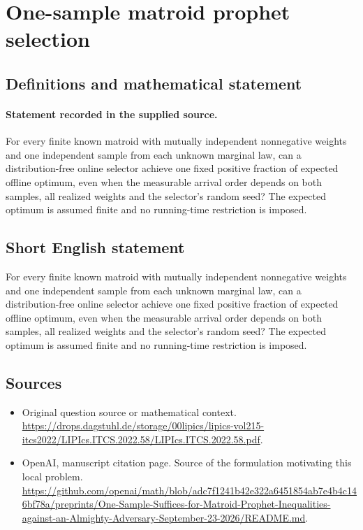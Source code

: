 \documentclass[11pt]{article}
\begin{document}
\section*{One-sample matroid prophet selection}\label{statement}
\subsection{Definitions and mathematical statement}
\paragraph{Statement recorded in the supplied source.}
For every finite known matroid with mutually independent nonnegative weights and one independent sample from each unknown marginal law, can a distribution-free online selector achieve one fixed positive fraction of expected offline optimum, even when the measurable arrival order depends on both samples, all realized weights and the selector’s random seed? The expected optimum is assumed finite and no running-time restriction is imposed.
\subsection{Short English statement}
For every finite known matroid with mutually independent nonnegative weights and one independent sample from each unknown marginal law, can a distribution-free online selector achieve one fixed positive fraction of expected offline optimum, even when the measurable arrival order depends on both samples, all realized weights and the selector’s random seed? The expected optimum is assumed finite and no running-time restriction is imposed.
\subsection{Sources}
\begin{itemize}
\item[S1] Original question source or mathematical context.
\url{https://drops.dagstuhl.de/storage/00lipics/lipics-vol215-itcs2022/LIPIcs.ITCS.2022.58/LIPIcs.ITCS.2022.58.pdf}.
\item[S2] OpenAI, manuscript citation page. Source of the formulation motivating this local problem.
\url{https://github.com/openai/math/blob/adc7f1241b42e322a6451854ab7e4b4c146bf78a/preprints/One-Sample-Suffices-for-Matroid-Prophet-Inequalities-against-an-Almighty-Adversary-September-23-2026/README.md}.
\end{itemize}
\end{document}
